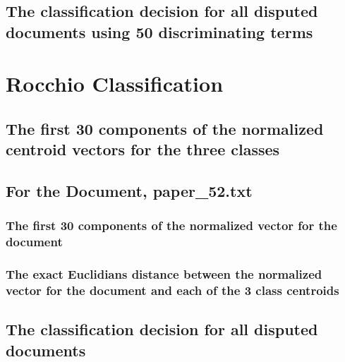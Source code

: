 \documentclass[12pt, letterpaper]{article}
\begin{document}
    \newpage

    \subsection{The classification decision for all disputed documents using
    50 discriminating terms}
    

    \newpage

    \section{Rocchio Classification}

    \subsection{The first 30 components of the normalized centroid vectors
    for the three classes}
    

    \newpage

    \subsection{For the Document, paper\_52.txt}

    \subsubsection{The first 30 components of the normalized vector for the
    document}
    

    \subsubsection{The exact Euclidians distance between the normalized vector
    for the document and each of the 3 class centroids}
    

    \newpage

    \subsection{The classification decision for all disputed documents}
    
\end{document}
